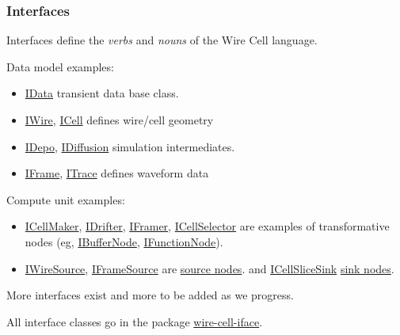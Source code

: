 \documentclass[xcolor=dvipsnames]{beamer}
\begin{document}
\begin{frame}[fragile]
  \frametitle{Interfaces}
  Interfaces define the \textit{verbs} and \textit{nouns} of the Wire Cell language.

  \vfill

  Data model examples:
  \begin{itemize}
  \item \href{https://github.com/WireCell/wire-cell-iface/blob/master/inc/WireCellIface/IData.h}{IData} transient data base class.
  \item \href{https://github.com/WireCell/wire-cell-iface/blob/master/inc/WireCellIface/IWire.h}{IWire},
    \href{https://github.com/WireCell/wire-cell-iface/blob/master/inc/WireCellIface/ICell.h}{ICell} defines wire/cell geometry
  \item \href{https://github.com/WireCell/wire-cell-iface/blob/master/inc/WireCellIface/IDepo.h}{IDepo}, 
    \href{https://github.com/WireCell/wire-cell-iface/blob/master/inc/WireCellIface/IDiffusion.h}{IDiffusion} simulation intermediates.
  \item \href{https://github.com/WireCell/wire-cell-iface/blob/master/inc/WireCellIface/IFrame.h}{IFrame}, 
    \href{https://github.com/WireCell/wire-cell-iface/blob/master/inc/WireCellIface/ITrace.h}{ITrace} defines waveform data
  \end{itemize}

  Compute unit examples:
  \begin{itemize}
  \item 
    \href{https://github.com/WireCell/wire-cell-iface/blob/master/inc/WireCellIface/ICellMaker.h}{ICellMaker},
    \href{https://github.com/WireCell/wire-cell-iface/blob/master/inc/WireCellIface/IDrifter.h}{IDrifter}, 
    \href{https://github.com/WireCell/wire-cell-iface/blob/master/inc/WireCellIface/IFramer.h}{IFramer}, 
    \href{https://github.com/WireCell/wire-cell-iface/blob/master/inc/WireCellIface/IChannelCellSelector.h}{ICellSelector} 
    are examples of transformative nodes 
    (eg, \href{https://github.com/WireCell/wire-cell-iface/blob/master/inc/WireCellIface/IBufferNode.h}{IBufferNode},
    \href{https://github.com/WireCell/wire-cell-iface/blob/master/inc/WireCellIface/IFunctionNode.h}{IFunctionNode}).
  \item 
    \href{https://github.com/WireCell/wire-cell-iface/blob/master/inc/WireCellIface/IWireSource.h}{IWireSource},
    \href{https://github.com/WireCell/wire-cell-iface/blob/master/inc/WireCellIface/IFrameSource.h}{IFrameSource} are 
    \href{https://github.com/WireCell/wire-cell-iface/blob/master/inc/WireCellIface/ISourceNode.h}{source nodes}.
    and \href{https://github.com/WireCell/wire-cell-iface/blob/master/inc/WireCellIface/ICellSliceSink.h}{ICellSliceSink}
    \href{https://github.com/WireCell/wire-cell-iface/blob/master/inc/WireCellIface/ISinkNode.h}{sink nodes}.
  \end{itemize}

  More interfaces exist and more to be added as we progress.

  \vfill
  
  All interface classes go in the package \href{https://github.com/WireCell/wire-cell-iface}{wire-cell-iface}.
\end{frame}
\end{document}
